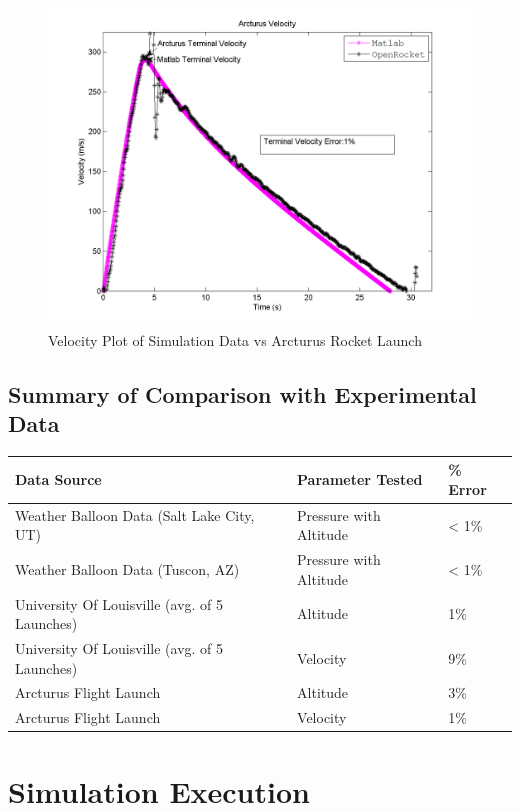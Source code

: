 \documentclass[]{article}
\begin{document}
\begin{figure}[htbp]
\centering
\includegraphics{images/plots/plot_arcturus_velocity_analysis.png}
\caption{Velocity Plot of Simulation Data vs Arcturus Rocket Launch
\label{arc_experimental_comparison_velocity_label}}
\end{figure}

\subsection{Summary of Comparison with Experimental
Data}\label{summary-of-comparison-with-experimental-data}

\begin{longtable}[c]{@{}lll@{}}
\toprule
Data Source & Parameter Tested & \% Error\tabularnewline
\midrule
\endhead
Weather Balloon Data (Salt Lake City, UT) & Pressure with Altitude &
\textless{} 1\%\tabularnewline
Weather Balloon Data (Tuscon, AZ) & Pressure with Altitude & \textless{}
1\%\tabularnewline
University Of Louisville (avg. of 5 Launches) & Altitude &
1\%\tabularnewline
University Of Louisville (avg. of 5 Launches) & Velocity &
9\%\tabularnewline
Arcturus Flight Launch & Altitude & 3\%\tabularnewline
Arcturus Flight Launch & Velocity & 1\%\tabularnewline
\bottomrule
\end{longtable}


\section{Simulation Execution}\label{simulation-execution}
\end{document}
